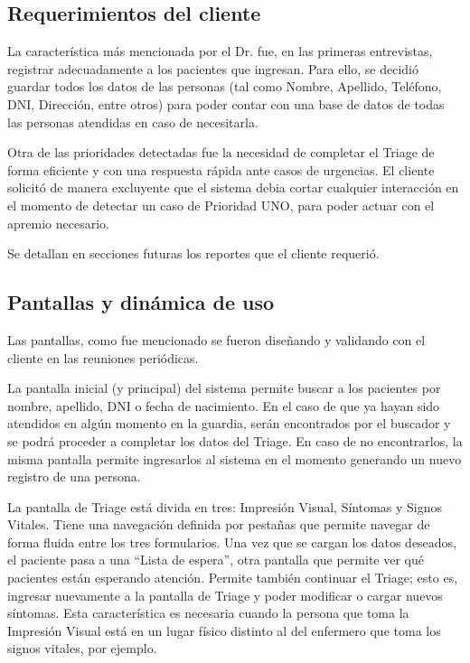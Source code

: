 \subsection{Requerimientos del cliente}
La característica más mencionada por el Dr. fue, en las primeras entrevistas, registrar adecuadamente a los pacientes que ingresan. Para ello, se decidió guardar todos los datos de las personas (tal como Nombre, Apellido, Teléfono, DNI, Dirección, entre otros) para poder contar con una base de datos de todas las personas atendidas en caso de necesitarla. 

Otra de las prioridades detectadas fue la necesidad de completar el Triage de forma eficiente y con una respuesta rápida ante casos de urgencias. El cliente solicitó de manera excluyente que el sistema debia cortar cualquier interacción en el momento de detectar un caso de Prioridad UNO, para poder actuar con el apremio necesario.

Se detallan en secciones futuras los reportes que el cliente requerió.


\subsection{Pantallas y dinámica de uso}
Las pantallas, como fue mencionado se fueron diseñando y validando con el cliente en las reuniones periódicas.

La pantalla inicial (y principal) del sistema permite buscar a los pacientes por nombre, apellido, DNI o fecha de nacimiento. En el caso de que ya hayan sido atendidos en algún momento en la guardia, serán encontrados por el buscador y se podrá proceder a completar los datos del Triage. En caso de no encontrarlos, la misma pantalla permite ingresarlos al sistema en el momento generando un nuevo registro de una persona. 

La pantalla de Triage está divida en tres: Impresión Visual, Síntomas y Signos Vitales. Tiene una navegación definida por pestañas que permite navegar de forma fluida entre los tres formularios. Una vez que se cargan los datos deseados, el paciente pasa a una ``Lista de espera'', otra pantalla que permite ver qué pacientes están esperando atención. Permite también continuar el Triage; esto es, ingresar nuevamente a la pantalla de Triage y poder modificar o cargar nuevos síntomas. Esta característica es necesaria cuando la persona que toma la Impresión Visual está en un lugar físico distinto al del enfermero que toma los signos vitales, por ejemplo.


